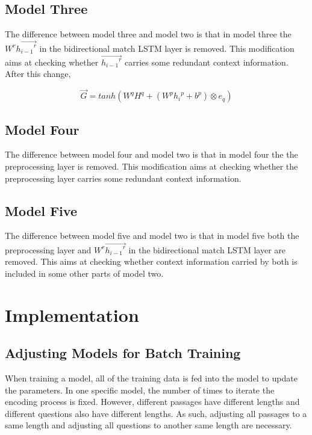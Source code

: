 \documentclass[modernstyle,12pt]{sjsuthesis}
\theoremstyle{definition}
\begin{document}
\section{Model Three}

The difference between model three and model two is that in model three the $W^r\overrightarrow{{h_{i-1}}^r}$ in the bidirectional match LSTM layer is removed. This modification aims at checking whether $\overrightarrow{{h_{i-1}}^r}$ carries some redundant context information. After this change,


$$\overrightarrow{G} = tanh(W^qH^q + (W^p{h_i}^p + b^p) \otimes e_q)$$


\section{Model Four}

The difference between model four and model two is that in model four the the preprocessing layer is removed. This modification aims at checking whether the preprocessing layer carries some redundant context information.

\section{Model Five}

The difference between model five and model two is that in model five both the preprocessing layer and $W^r\overrightarrow{{h_{i-1}}^r}$ in the bidirectional match LSTM layer are removed. This aims at checking whether context information carried by both is included in some other parts of model two.

\chapter{Implementation}

\section{Adjusting Models for Batch Training}\label{sect:padding}

When training a model, all of the training data is fed into the model to update the parameters. In one specific model, the number of times to iterate the encoding process is fixed. However, different passages have different lengths and different questions also have different lengths. As such, adjusting all passages to a same length and adjusting all questions to another same length are necessary.
\end{document}
